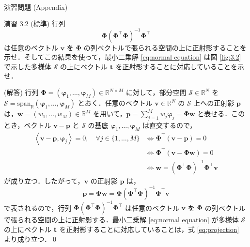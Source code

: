 \documentclass[uplatex,11pt,dvipdfmx,aspectratio=169,unicode,t]{beamer}
\numberwithin{equation}{section}
\newcommand{\BR}{\mathbb{R}}
\newcommand{\CS}{\mathcal{S}}
\newcommand{\tb}[1]{\textbf{#1}}
\newcommand{\ts}[1]{\textsf{#1}}
\newcommand{\ip}[1]{\left \langle #1 \right \rangle}
\newcommand{\bs}[1]{\boldsymbol{#1}}
\newcommand{\1}{\bs{1}}
\newcommand{\0}{\bs{0}}
\begin{document}
\begin{frame}{演習問題 (Appendix)}
    \fontsize{7pt}{0cm}\selectfont
    \begin{block}{演習 3.2 (標準)}
        行列
        \begin{equation}
            \bs{\Phi} \left(\bs{\Phi}^{\top} \bs{\Phi}\right)^{-1} \bs{\Phi}^{\top}
        \end{equation}
        は任意のベクトル $\bs{v}$ を $\bs{\Phi}$ の列ベクトルで張られる空間の上に正射影することを示せ．そしてこの結果を使って，最小二乗解 \eqref{eq:normal equation} は図 \ref{fig:3.2} で示した多様体 $\CS$ の上にベクトル $\tb{\ts{t}}$ を正射影することに対応していることを示せ．
    \end{block}
    (解答) 行列 $\bs{\Phi} = \left(\bs{\varphi}_{1},\ldots,\bs{\varphi}_{M}\right) \in \BR^{N \times M}$ に対して，部分空間 $\CS \in \BR^{N}$ を $\CS = \text{span}_{\BR}\left(\bs{\varphi}_{1},\ldots,\bs{\varphi}_{M}\right)$ とおく．任意のベクトル $\bs{v} \in \BR^{N}$ の $\CS$ 上への正射影 $\bs{p}$ は，$\bs{w} = (w_{1},\ldots,w_{M}) \in \BR^{M}$ を用いて，$\bs{p} = \sum_{j=1}^{M} w_{j} \bs{\varphi}_{j} = \bs{\Phi} \bs{w}$ と表せる．このとき，ベクトル $\bs{v} - \bs{p}$ と $\CS$ の基底 $\bs{\varphi}_{1},\ldots,\bs{\varphi}_{M}$ は直交するので，
    \begin{align}
        \ip{\bs{v} - \bs{p}, \bs{\varphi}_{j}} = 0, \quad \forall j \in \{1,\ldots,M\} &\iff \bs{\Phi}^{\top} (\bs{v} - \bs{p}) = 0 \\
        &\iff \bs{\Phi}^{\top} (\bs{v} - \bs{\Phi} \bs{w}) = 0 \\
        &\iff \bs{w} = \left(\bs{\Phi}^{\top} \bs{\Phi}\right)^{-1} \bs{\Phi}^{\top} \bs{v}
    \end{align}
    が成り立つ．したがって，$\bs{v}$ の正射影 $\bs{p}$ は，
    \begin{equation}
        \bs{p} = \bs{\Phi} \bs{w} = \bs{\Phi} \left(\bs{\Phi}^{\top} \bs{\Phi}\right)^{-1} \bs{\Phi}^{\top} \bs{v}
    \end{equation}
    で表されるので，行列 $\bs{\Phi} \left(\bs{\Phi}^{\top} \bs{\Phi}\right)^{-1} \bs{\Phi}^{\top}$ は任意のベクトル $\bs{v}$ を $\bs{\Phi}$ の列ベクトルで張られる空間の上に正射影する．最小二乗解 \eqref{eq:normal equation} が多様体 $\CS$ の上にベクトル $\tb{\ts{t}}$ を正射影することに対応していることは，式 \eqref{eq:projection} より成り立つ．\qed
\end{frame}
\end{document}
